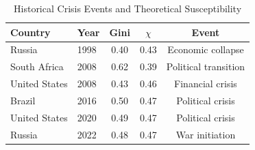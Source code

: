 
\begin{table}[htbp]
\centering
\caption{Historical Crisis Events and Theoretical Susceptibility}
\label{tab:crisis_events}
\begin{tabular}{llccc}
\toprule
\textbf{Country} & \textbf{Year} & \textbf{Gini} & \textbf{$\chi$} & \textbf{Event} \\
\midrule
Russia & 1998 & 0.40 & 0.43 & Economic collapse \\
South Africa & 2008 & 0.62 & 0.39 & Political transition \\
United States & 2008 & 0.43 & 0.46 & Financial crisis \\
Brazil & 2016 & 0.50 & 0.47 & Political crisis \\
United States & 2020 & 0.49 & 0.47 & Political crisis \\
Russia & 2022 & 0.48 & 0.47 & War initiation \\
\bottomrule
\end{tabular}
\end{table}
